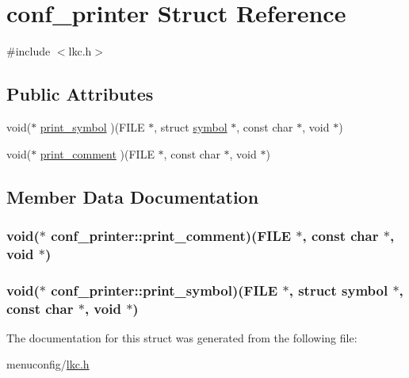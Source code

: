 \hypertarget{structconf__printer}{\section{conf\-\_\-printer Struct Reference}
\label{structconf__printer}
}


{\ttfamily \#include $<$lkc.\-h$>$}

\subsection*{Public Attributes}
\begin{DoxyCompactItemize}
\item 
void($\ast$ \hyperlink{structconf__printer_a540fb3c9d373d94f12c262c6c8de801a}{print\-\_\-symbol} )(F\-I\-L\-E $\ast$, struct \hyperlink{structsymbol}{symbol} $\ast$, const char $\ast$, void $\ast$)
\item 
void($\ast$ \hyperlink{structconf__printer_ab2ca122b1f6000597de6df20fa56ae47}{print\-\_\-comment} )(F\-I\-L\-E $\ast$, const char $\ast$, void $\ast$)
\end{DoxyCompactItemize}


\subsection{Member Data Documentation}
\hypertarget{structconf__printer_ab2ca122b1f6000597de6df20fa56ae47}{
\subsubsection[{print\-\_\-comment}]{\setlength{\rightskip}{0pt plus 5cm}void($\ast$ conf\-\_\-printer\-::print\-\_\-comment)(F\-I\-L\-E $\ast$, const char $\ast$, void $\ast$)}}\label{structconf__printer_ab2ca122b1f6000597de6df20fa56ae47}
\hypertarget{structconf__printer_a540fb3c9d373d94f12c262c6c8de801a}{
\subsubsection[{print\-\_\-symbol}]{\setlength{\rightskip}{0pt plus 5cm}void($\ast$ conf\-\_\-printer\-::print\-\_\-symbol)(F\-I\-L\-E $\ast$, struct {\bf symbol} $\ast$, const char $\ast$, void $\ast$)}}\label{structconf__printer_a540fb3c9d373d94f12c262c6c8de801a}


The documentation for this struct was generated from the following file\-:\begin{DoxyCompactItemize}
\item 
menuconfig/\hyperlink{lkc_8h}{lkc.\-h}\end{DoxyCompactItemize}
